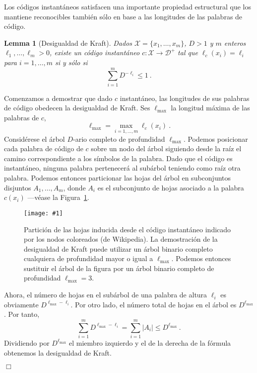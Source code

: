 \documentclass[11pt]{article}
\newtheorem{lemma}[theorem]{Lemma}
\newenvironment{proof}{{\textsc{Dimostrazione.}\ }}{\hfill$\Box$\\[2mm]}
\newcommand{\figscale}[2]{\texttt{[image: \#1]}}
\newcommand{\scD}{\mathcal{D}}
\newcommand{\scX}{\mathcal{X}}
\newcommand{\lmax}{\ell_{\textrm{max}}}
\begin{document}
Los códigos instantáneos satisfacen una importante propiedad estructural que los mantiene reconocibles también sólo en base a las longitudes de las palabras de código.
%
\begin{lemma}[Desigualdad de Kraft]
Dados $\scX = \{x_1,\dots,x_m\}$, $D > 1$ y $m$ enteros $\ell_1,\dots,\ell_m > 0$, existe un código instantáneo $c : \scX \to \scD^+$ tal que $\ell_c(x_i) = \ell_i$ para $i=1,\dots,m$ si y sólo si
\[
    \sum_{i=1}^m D^{-\ell_i} \le 1~.
\]
\end{lemma}
%
\begin{proof}
Comenzamos a demostrar que dado $c$ instantáneo, las longitudes de sus palabras de código obedecen la desigualdad de Kraft. Ses $\lmax$ la longitud máxima de las palabras de $c$,
\[
    \lmax = \max_{i=1,\dots,m} \ell_c(x_i)~.
\]
Considérese el árbol $D$-ario completo de profundidad $\lmax$. Podemos posicionar cada palabra de código de $c$ sobre un nodo del árbol siguiendo desde la raíz el camino correspondiente a los símbolos de la palabra. Dado que el código es instantáneo, ninguna palabra pertenecerá al subárbol teniendo como raíz otra palabra. Podemos entonces particionar las hojas del árbol en subconjuntos disjuntos $A_1,\dots,A_m$, donde $A_i$ es el subconjunto de hojas asociado a la palabra $c(x_i)$ ---véase la Figura~\ref{fig:kraft}.
%
\begin{figure}[h]
\begin{center}
\figscale{Images/kraft}{0.4}
\end{center}
\caption{
\label{fig:kraft}
Partición de las hojas inducida desde el código instantáneo indicado por los nodos coloreados (de Wikipedia). La demostración de la desigualdad de Kraft puede utilizar un árbol binario completo cualquiera de profundidad mayor o igual a $\lmax$. Podemos entonces sustituir el árbol de la figura por un árbol binario completo de profundidad $\lmax = 3$.
}
\end{figure}

Ahora, el número de hojas en el subárbol de una palabra de altura $\ell_i$ es obviamente $D^{\lmax-\ell_i}$. Por otro lado, el número total de hojas en el árbol es $D^{\lmax}$. Por tanto,
\[
    \sum_{i=1}^m D^{\lmax-\ell_i} = \sum_{i=1}^m |A_i| \le D^{\lmax}~.
\]
Dividiendo por $D^{\lmax}$ el miembro izquierdo y el de la derecha de la fórmula obtenemos la desigualdad de Kraft.


\end{proof}
\end{document}
